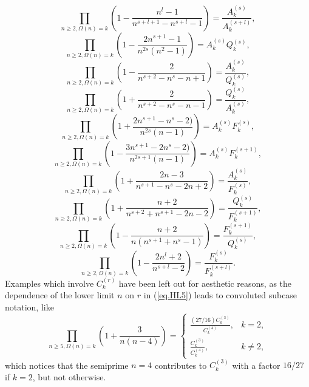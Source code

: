\documentclass{amsart}
\begin{document}
\begin{equation}
\prod_{n\ge 2,\Omega(n)=k}
\left( 1-\frac{n^l-1}{n^{s+l+1}-n^{s+l}-1}\right)
=
\frac{ A_k^{(s)} }{ A_k^{(s+l)}}
,
\end{equation}
\begin{equation}
\prod_{n\ge 2,\Omega(n)=k}
\left( 1-\frac{2n^{s+1}-1}{n^{2s}(n^2-1)}\right)
=
A_k^{(s)} Q_k^{(s)}
,
\end{equation}
\begin{equation}
\prod_{n\ge 2,\Omega(n)=k}
\left( 1-\frac{2}{n^{s+2}-n^s-n+1}\right)
=
\frac{A_k^{(s)}}{ Q_k^{(s)}}
,
\end{equation}
\begin{equation}
\prod_{n\ge 2,\Omega(n)=k}
\left( 1+\frac{2}{n^{s+2}-n^s-n-1}\right)
=
\frac{Q_k^{(s)}}{ A_k^{(s)}}
,
\end{equation}
\begin{equation}
\prod_{n\ge 2,\Omega(n)=k}
\left( 1+\frac{2n^{s+1}-n^s-2)}{n^{2s}(n-1)}\right)
=
A_k^{(s)} F_k^{(s)}
,
\end{equation}
\begin{equation}
\prod_{n\ge 2,\Omega(n)=k}
\left( 1-\frac{3n^{s+1}-2n^s-2)}{n^{2s+1}(n-1)}\right)
=
A_k^{(s)} F_k^{(s+1)}
,
\end{equation}
\begin{equation}
\prod_{n\ge 2,\Omega(n)=k}
\left( 1+\frac{2n-3}{n^{s+1}-n^s-2n+2}\right)
=
\frac{A_k^{(s)}}{ F_k^{(s)}}
,
\end{equation}
\begin{equation}
\prod_{n\ge 2,\Omega(n)=k}
\left( 1+\frac{n+2}{n^{s+2}+n^{s+1}-2n-2}\right)
=
\frac{Q_k^{(s)}}{ F_k^{(s+1)}}
,
\end{equation}
\begin{equation}
\prod_{n\ge 2,\Omega(n)=k}
\left( 1-\frac{n+2}{n(n^{s+1}+n^s-1)}\right)
=
\frac{F_k^{(s+1)}}{ Q_k^{(s)}}
,
\end{equation}
\begin{equation}
\prod_{n\ge 2,\Omega(n)=k}
\left( 1-\frac{2n^l+2}{n^{s+l}-2}\right)
=
\frac{F_k^{(s)}}{ F_k^{(s+l)}}
.
\end{equation}
Examples which involve $C_k^{(r)}$ have been left out for aesthetic
reasons, as
the dependence of the lower limit $n$ on $r$
in (\ref{eq.HL5}) leads to convoluted
subcase notation, like
\begin{equation}
\prod_{n\ge 5,\Omega(n)=k}
\left( 1+\frac{3}{n(n-4)}\right)
=
\left\{
\begin{array}{ll}
\frac{(27/16) C_k^{(3)}}{ C_k^{(4)}}, & k=2,\\
\frac{C_k^{(3)}}{ C_k^{(4)}}, & k\neq 2,
\end{array}
\right.
\end{equation}
which notices that the semiprime $n=4$ contributes to $C_k^{(3)}$
with a factor $16/27$
if $k=2$, but not otherwise.



\end{document}
